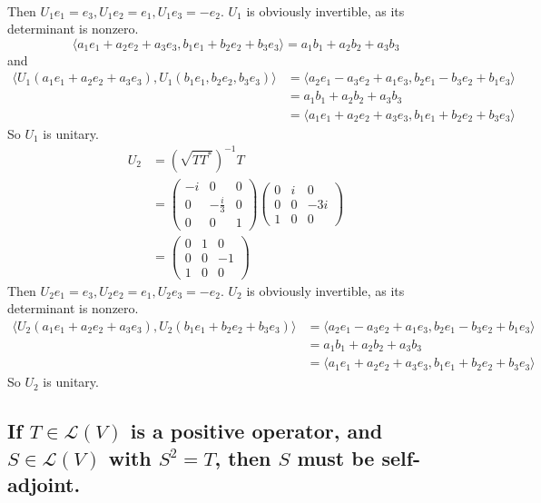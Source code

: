 \documentclass[answers]{exam}
\begin{document}
\begin{questions}
\begin{solution}
\begin{align*}
	\end{align*}
	Then $U_1e_1 = e_3, U_1e_2 = e_1, U_1e_3 = -e_2$. $U_1$ is obviously invertible, as its determinant is nonzero.
	$$\langle a_1e_1+a_2e_2+a_3e_3,b_1e_1+b_2e_2+b_3e_3 \rangle = a_1b_1+a_2b_2+a_3b_3$$
	and
	\begin{align*}
		\langle U_1(a_1e_1+a_2e_2+a_3e_3),U_1(b_1e_1,b_2e_2,b_3e_3) \rangle &= \langle a_2e_1-a_3e_2+a_1e_3,b_2e_1-b_3e_2+b_1e_3 \rangle \\
										    &= a_1b_1+a_2b_2+a_3b_3 \\
										    &= \langle a_1e_1+a_2e_2+a_3e_3,b_1e_1+b_2e_2+b_3e_3 \rangle
	\end{align*}
	So $U_1$ is unitary.
	\begin{align*}
		U_2 &= (\sqrt{TT^*})^{-1}T \\
		    &= \begin{pmatrix} -i & 0 & 0 \\ 0 & -\frac{i}{3} & 0 \\ 0 & 0 & 1 \end{pmatrix} \begin{pmatrix} 0 & i & 0 \\ 0 & 0 & -3i \\ 1 & 0 & 0 \end{pmatrix} \\
		    &= \begin{pmatrix} 0 & 1 & 0 \\ 0 & 0 & -1 \\ 1 & 0 & 0 \end{pmatrix}
	\end{align*}
	Then $U_2e_1 = e_3, U_2e_2 = e_1, U_2e_3 = -e_2$. $U_2$ is obviously invertible, as its determinant is nonzero.
	\begin{align*}
		\langle U_2(a_1e_1+a_2e_2+a_3e_3),U_2(b_1e_1+b_2e_2+b_3e_3) \rangle &= \langle a_2e_1-a_3e_2+a_1e_3,b_2e_1-b_3e_2+b_1e_3 \rangle \\
										    &= a_1b_1+a_2b_2+a_3b_3 \\
										    &= \langle a_1e_1+a_2e_2+a_3e_3,b_1e_1+b_2e_2+b_3e_3 \rangle
	\end{align*}
	So $U_2$ is unitary.
\end{solution}


\begin{parts}
	\part{If $T \in \mathcal L(V)$ is a positive operator, and $S \in \mathcal L(V)$ with $S^2=T$, then $S$ must be self-adjoint.}

\end{parts}
\end{questions}
\end{document}

